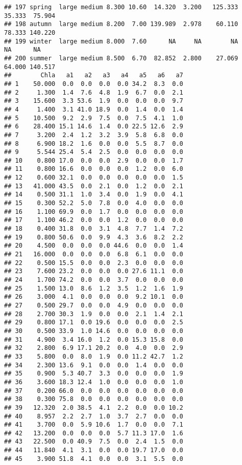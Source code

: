 \documentclass[
]{article}
\begin{document}
\begin{verbatim}
## 197 spring  large medium 8.300 10.60  14.320  3.200   125.333  35.333  75.904
## 198 autumn  large medium 8.200  7.00 139.989  2.978    60.110  78.333 140.220
## 199 winter  large medium 8.000  7.60      NA     NA        NA      NA      NA
## 200 summer  large medium 8.500  6.70  82.852  2.800    27.069  64.000 140.517
##        Chla   a1   a2   a3   a4   a5   a6   a7
## 1    50.000  0.0  0.0  0.0  0.0 34.2  8.3  0.0
## 2     1.300  1.4  7.6  4.8  1.9  6.7  0.0  2.1
## 3    15.600  3.3 53.6  1.9  0.0  0.0  0.0  9.7
## 4     1.400  3.1 41.0 18.9  0.0  1.4  0.0  1.4
## 5    10.500  9.2  2.9  7.5  0.0  7.5  4.1  1.0
## 6    28.400 15.1 14.6  1.4  0.0 22.5 12.6  2.9
## 7     3.200  2.4  1.2  3.2  3.9  5.8  6.8  0.0
## 8     6.900 18.2  1.6  0.0  0.0  5.5  8.7  0.0
## 9     5.544 25.4  5.4  2.5  0.0  0.0  0.0  0.0
## 10    0.800 17.0  0.0  0.0  2.9  0.0  0.0  1.7
## 11    0.800 16.6  0.0  0.0  0.0  1.2  0.0  6.0
## 12    0.600 32.1  0.0  0.0  0.0  0.0  0.0  1.5
## 13   41.000 43.5  0.0  2.1  0.0  1.2  0.0  2.1
## 14    0.500 31.1  1.0  3.4  0.0  1.9  0.0  4.1
## 15    0.300 52.2  5.0  7.8  0.0  4.0  0.0  0.0
## 16    1.100 69.9  0.0  1.7  0.0  0.0  0.0  0.0
## 17    1.100 46.2  0.0  0.0  1.2  0.0  0.0  0.0
## 18    0.400 31.8  0.0  3.1  4.8  7.7  1.4  7.2
## 19    0.800 50.6  0.0  9.9  4.3  3.6  8.2  2.2
## 20    4.500  0.0  0.0  0.0 44.6  0.0  0.0  1.4
## 21   16.000  0.0  0.0  0.0  6.8  6.1  0.0  0.0
## 22    0.500 15.5  0.0  0.0  2.3  0.0  0.0  0.0
## 23    7.600 23.2  0.0  0.0  0.0 27.6 11.1  0.0
## 24    1.700 74.2  0.0  0.0  3.7  0.0  0.0  0.0
## 25    1.500 13.0  8.6  1.2  3.5  1.2  1.6  1.9
## 26    3.000  4.1  0.0  0.0  0.0  9.2 10.1  0.0
## 27    0.500 29.7  0.0  0.0  4.9  0.0  0.0  0.0
## 28    2.700 30.3  1.9  0.0  0.0  2.1  1.4  2.1
## 29    0.800 17.1  0.0 19.6  0.0  0.0  0.0  2.5
## 30    0.500 33.9  1.0 14.6  0.0  0.0  0.0  0.0
## 31    4.900  3.4 16.0  1.2  0.0 15.3 15.8  0.0
## 32    2.800  6.9 17.1 20.2  0.0  4.0  0.0  2.9
## 33    5.800  0.0  8.0  1.9  0.0 11.2 42.7  1.2
## 34    2.300 13.6  9.1  0.0  0.0  1.4  0.0  0.0
## 35    0.900  5.3 40.7  3.3  0.0  0.0  0.0  1.9
## 36    3.600 18.3 12.4  1.0  0.0  0.0  0.0  1.0
## 37    0.200 66.0  0.0  0.0  0.0  0.0  0.0  0.0
## 38    0.300 75.8  0.0  0.0  0.0  0.0  0.0  0.0
## 39   12.320  2.0 38.5  4.1  2.2  0.0  0.0 10.2
## 40    8.957  2.2  2.7  1.0  3.7  2.7  0.0  0.0
## 41    3.700  0.0  5.9 10.6  1.7  0.0  0.0  7.1
## 42   13.200  0.0  0.0  0.0  5.7 11.3 17.0  1.6
## 43   22.500  0.0 40.9  7.5  0.0  2.4  1.5  0.0
## 44   11.840  4.1  3.1  0.0  0.0 19.7 17.0  0.0
## 45    3.900 51.8  4.1  0.0  0.0  3.1  5.5  0.0

\end{verbatim}
\end{document}
